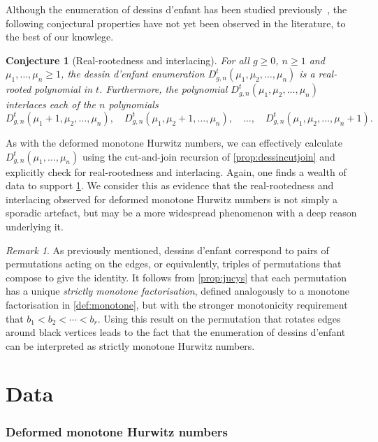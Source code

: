 \documentclass[a4paper]{article}
\theoremstyle{plain}
\newtheorem{conjecture}[theorem]{Conjecture}
\numberwithin{theorem}{section}
\theoremstyle{definition}
\theoremstyle{remark}
\newtheorem{remark}[theorem]{Remark}
\renewcommand{\geq}{\geqslant}
\begin{document}
Although the enumeration of dessins d'enfant has been studied previously~\cite{kaz-zog15}, the following conjectural properties have not yet been observed in the literature, to the best of our knowlege.


\begin{conjecture} [Real-rootedness and interlacing] \label{con:dessins}
For all $g \geq 0$, $n \geq 1$ and $\mu_1, \ldots, \mu_n \geq 1$, the dessin d'enfant enumeration $D_{g,n}^t(\mu_1, \mu_2, \ldots, \mu_n)$ is a real-rooted polynomial in $t$. Furthermore, the polynomial $D_{g,n}^t(\mu_1, \mu_2, \ldots, \mu_n)$ interlaces each of the $n$ polynomials
\[
D_{g,n}^t(\mu_1+1, \mu_2, \ldots, \mu_n), \quad D_{g,n}^t(\mu_1, \mu_2+1, \ldots, \mu_n), \quad \ldots, \quad D_{g,n}^t(\mu_1, \mu_2, \ldots, \mu_n+1).
\]
\end{conjecture}


As with the deformed monotone Hurwitz numbers, we can effectively calculate $D_{g,n}^t(\mu_1, \ldots, \mu_n)$ using the cut-and-join recursion of \cref{prop:dessincutjoin} and explicitly check for real-rootedness and interlacing. Again, one finds a wealth of data to support \cref{con:dessins}. We consider this as evidence that the real-rootedness and interlacing observed for deformed monotone Hurwitz numbers is not simply a sporadic artefact, but may be a more widespread phenomenon with a deep reason underlying it.


\begin{remark}
As previously mentioned, dessins d'enfant correspond to pairs of permutations acting on the edges, or equivalently, triples of permutations that compose to give the identity. It follows from \cref{prop:jucys} that each permutation has a unique {\em strictly monotone factorisation}, defined analogously to a monotone factorisation in \cref{def:monotone}, but with the stronger monotonicity requirement that $b_1 < b_2 < \cdots < b_r$. Using this result on the permutation that rotates edges around black vertices leads to the fact that the enumeration of dessins d'enfant can be interpreted as strictly monotone Hurwitz numbers.\end{remark}



\appendix

\section{Data} \label{app:data}

\subsubsection*{Deformed monotone Hurwitz numbers}
\end{document}
